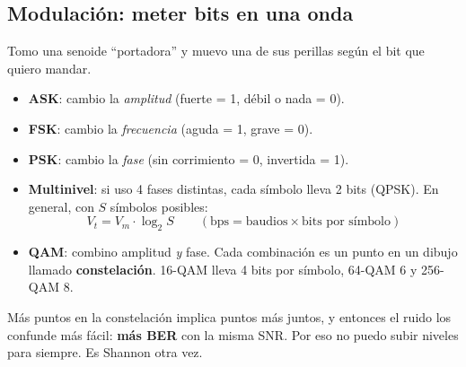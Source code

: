 \documentclass[10pt,a4paper]{article}
\newcommand{\term}[1]{\textbf{\color{azul}#1}}
\begin{document}
\subsection{Modulación: meter bits en una onda}
\begin{idea}
Tomo una senoide ``portadora'' y muevo una de sus perillas según el bit que quiero mandar.
\end{idea}
\begin{itemize}
  \item \term{ASK}: cambio la \emph{amplitud} (fuerte = 1, débil o nada = 0).
  \item \term{FSK}: cambio la \emph{frecuencia} (aguda = 1, grave = 0).
  \item \term{PSK}: cambio la \emph{fase} (sin corrimiento = 0, invertida = 1).
  \item \textbf{Multinivel}: si uso 4 fases distintas, cada símbolo lleva 2 bits (QPSK). En general, con $S$ símbolos posibles: \[V_{t} = V_{m}\cdot\log_2 S \qquad (\text{bps} = \text{baudios} \times \text{bits por símbolo})\]
  \item \term{QAM}: combino amplitud \emph{y} fase. Cada combinación es un punto en un dibujo llamado \term{constelación}. 16-QAM lleva 4 bits por símbolo, 64-QAM 6 y 256-QAM 8.
\end{itemize}
\begin{ojo}
Más puntos en la constelación implica puntos más juntos, y entonces el ruido los confunde más fácil: \textbf{más BER} con la misma SNR.
Por eso no puedo subir niveles para siempre. Es Shannon otra vez.
\end{ojo}
\end{document}
